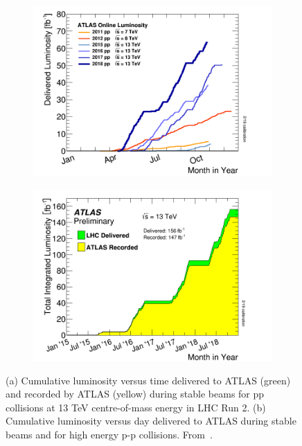 \begin{figure}[]
    \centering
    \begin{subfigure}[b]{0.49\textwidth}
        \centering
        \includegraphics[width=\textwidth]{images/intlumivsyear.png}
        \caption{}
        \label{fig:method:Lumi:lumirun2year}
    \end{subfigure}
    \begin{subfigure}[b]{0.49\textwidth}
        \centering
        \includegraphics[width=\textwidth]{images/intlumivstimeRun2.png}
        \caption{}
        \label{fig:method:Lumi:lumiRun2vsatlas}
    \end{subfigure}
    \caption[Total Integrated Luminosity at Run 2 (13 TeV pp data only);
    Delivered Luminosity versus time for 2011-2018 (p-p data only)]{(a) Cumulative luminosity versus time delivered to ATLAS (green) and recorded by ATLAS (yellow) during stable beams for pp collisions at 13 TeV centre-of-mass energy in LHC Run 2. (b) Cumulative luminosity versus day delivered to ATLAS during stable beams and for high energy p-p collisions.
    From~\cite{ATLAS:lumiPlots}.}
    \label{}
\end{figure}